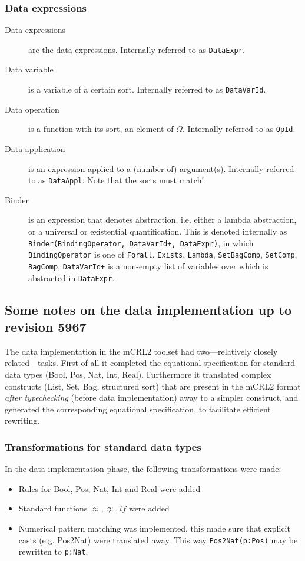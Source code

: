 \documentclass[a4paper,11pt]{article}
\newcommand{\f}[1]{{\mathit{#1}}}
\begin{document}
\subsubsection{Data expressions}
\begin{description}
 \item[Data expressions] are the data expressions. Internally referred to as \texttt{DataExpr}.
 \item[Data variable] is a variable of a certain sort. Internally referred to as \texttt{DataVarId}.
 \item[Data operation] is a function with its sort, an element of $\Omega$. Internally referred to as \texttt{OpId}.
 \item[Data application] is an expression applied to a (number of) argument(s). Internally referred to as \texttt{DataAppl}. Note that the sorts must match!
 \item[Binder] is an expression that denotes abstraction, i.e. either a lambda abstraction, or a universal or existential quantification. This is denoted internally as \texttt{Binder(BindingOperator, DataVarId+, DataExpr)}, in which \texttt{BindingOperator} is one of \texttt{Forall}, \texttt{Exists}, \texttt{Lambda}, \texttt{SetBagComp}, \texttt{SetComp}, \texttt{BagComp}, \texttt{DataVarId+} is a non-empty list of variables over which is abstracted in \texttt{DataExpr}.
\end{description}

\subsection{Some notes on the data implementation up to revision 5967}
The data implementation in the mCRL2 toolset had two---relatively closely related---tasks. First of all it completed the equational specification for standard data types (Bool, Pos, Nat, Int, Real). Furthermore it translated complex constructs (List, Set, Bag, structured sort) that are present in the mCRL2 format \emph{after typechecking} (before data implementation) away to a simpler construct, and generated the corresponding equational specification, to facilitate efficient rewriting.

\subsubsection{Transformations for standard data types}
In the data implementation phase, the following transformations were made:
\begin{itemize}
 \item Rules for Bool, Pos, Nat, Int and Real were added
 \item Standard functions $\approx, \not \approx, \f{if}$ were added
 \item Numerical pattern matching was implemented, this made sure that explicit casts (e.g. Pos2Nat) were translated away. This way \texttt{Pos2Nat(p:Pos)} may be rewritten to \texttt{p:Nat}.
\end{itemize}
\end{document}
